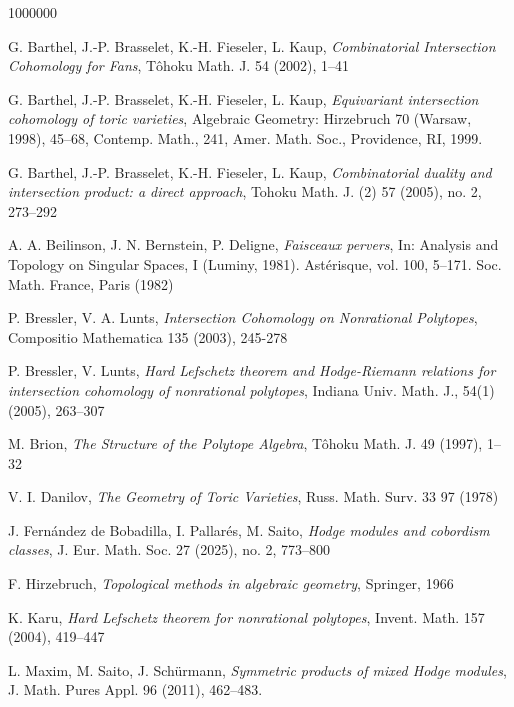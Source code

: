 \documentclass[12pt,leqno,twoside]{amsart}
\begin{document}
\begin{thebibliography}{1000000}

  
 
   
     G. Barthel, J.-P. Brasselet, K.-H. Fieseler, L. Kaup, {\it Combinatorial Intersection Cohomology for Fans}, Tôhoku Math. J. 54 (2002), 1–41

     G. Barthel, J.-P. Brasselet, K.-H. Fieseler, L. Kaup, {\it Equivariant intersection cohomology of toric varieties}, Algebraic Geometry: Hirzebruch 70 
 (Warsaw, 1998), 45–68, Contemp. Math., 241, Amer. Math. Soc., Providence, RI, 1999.

   G. Barthel, J.-P. Brasselet, K.-H. Fieseler, L. Kaup, {\it 
Combinatorial duality and intersection product: a direct approach}, 
Tohoku Math. J. (2) 57 (2005), no. 2, 273–292

 A. A. Beilinson, J. N. Bernstein, P. Deligne, {\it Faisceaux pervers}, In: Analysis and Topology on Singular
Spaces, I (Luminy, 1981). Ast\'erisque, vol. 100, 5–171. Soc. Math. France, Paris (1982)

   P. Bressler, V. A. Lunts, {\it Intersection Cohomology on Nonrational Polytopes}, Compositio Mathematica 135 (2003), 245-278

    P. Bressler, V. Lunts, {\it Hard Lefschetz theorem and Hodge-Riemann relations for intersection cohomology of nonrational polytopes},  Indiana Univ. Math. J., 54(1) (2005), 263–307

  M. Brion, {\it The Structure of the Polytope Algebra}, Tôhoku Math. J. 49 (1997), 1–32

   V. I. Danilov, {\it The Geometry of Toric Varieties}, Russ. Math. Surv. 33 97 (1978)

  

     J. Fern\'andez de Bobadilla, I. Pallar\'es, M. Saito, {\it Hodge modules and cobordism classes}, J. Eur. Math. Soc. 27 (2025), no. 2, 773–800

 F. Hirzebruch, {\it Topological methods in algebraic geometry}, Springer, 1966

     K. Karu, {\it Hard Lefschetz theorem for nonrational polytopes}, Invent. Math. 157 (2004), 419–447

       L. Maxim, M. Saito, J. Sch\"urmann, {\it Symmetric products of mixed Hodge modules}, J. Math. Pures Appl.
96 (2011), 462–483.


\end{thebibliography}
\end{document}
